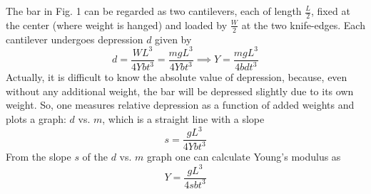 \documentclass[11pt]{scrartcl}
\begin{document}
The bar in Fig. 1 can be regarded as two cantilevers, each of length \(\frac{L}{2}\),
fixed at the center (where weight is hanged) and loaded by \(\frac{W}{2}\) at the
two knife-edges. Each cantilever undergoes depression \(d\) given by 
\begin{equation}
    d = \frac{WL^3}{4Ybt^3} = \frac{mgL^3}{4Ybt^3} \implies Y = \frac{mgL^3}{4bdt^3}
\end{equation}
Actually, it is difficult to know the absolute value of depression, because, even without any additional weight, the bar will be
depressed slightly due to its own weight. So, one measures relative depression as a function of added weights and plots a graph:
\(d\) vs. \(m\), which is a straight line with a slope
\[s = \frac{gL^3}{4Ybt^3}\]
From the slope \(s\) of the \(d\) vs. \(m\) graph one can calculate Young's
modulus as
\begin{equation}
    \boxed{Y = \frac{gL^3}{4sbt^3}}
    \label{eqn:main}
\end{equation}
\end{document}
